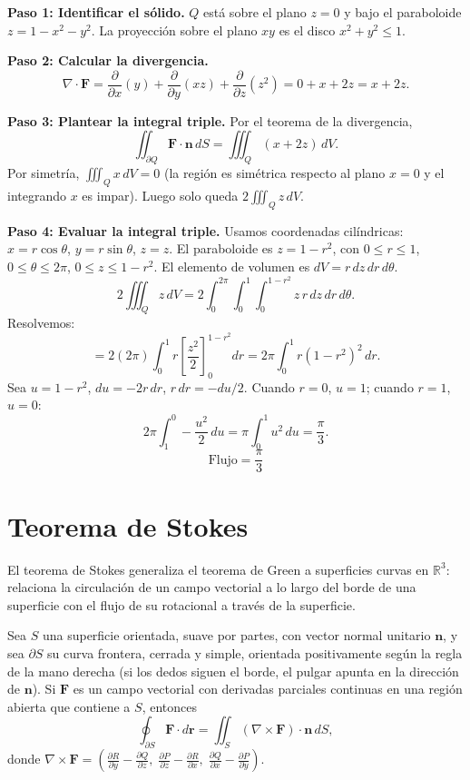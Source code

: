 \begin{myproof}
\textbf{Paso 1: Identificar el sólido.}
$Q$ está sobre el plano $z=0$ y bajo el paraboloide $z=1-x^2-y^2$. La proyección sobre el plano $xy$ es el disco $x^2+y^2\le 1$.

\textbf{Paso 2: Calcular la divergencia.}
\[
\nabla\cdot\mathbf{F}
= \frac{\partial}{\partial x}(y) + \frac{\partial}{\partial y}(xz) + \frac{\partial}{\partial z}(z^2)
= 0 + x + 2z = x+2z.
\]

\textbf{Paso 3: Plantear la integral triple.}
Por el teorema de la divergencia,
\[
\iint_{\partial Q}\mathbf{F}\cdot\mathbf{n}\,dS
= \iiint_Q (x+2z)\,dV.
\]
Por simetría, $\iiint_Q x\,dV = 0$ (la región es simétrica respecto al plano $x=0$ y el integrando $x$ es impar). Luego solo queda $2\iiint_Q z\,dV$.

\textbf{Paso 4: Evaluar la integral triple.}
Usamos coordenadas cilíndricas: $x=r\cos\theta$, $y=r\sin\theta$, $z=z$. El paraboloide es $z=1-r^2$, con $0\le r\le 1$, $0\le\theta\le 2\pi$, $0\le z\le 1-r^2$. El elemento de volumen es $dV = r\,dz\,dr\,d\theta$.
\[
2\iiint_Q z\,dV
= 2\int_0^{2\pi}\int_0^1\int_0^{1-r^2} z\,r\,dz\,dr\,d\theta.
\]
Resolvemos:
\[
= 2(2\pi)\int_0^1 r\left[\frac{z^2}{2}\right]_0^{1-r^2} dr
= 2\pi\int_0^1 r(1-r^2)^2\,dr.
\]
Sea $u=1-r^2$, $du=-2r\,dr$, $r\,dr=-du/2$. Cuando $r=0$, $u=1$; cuando $r=1$, $u=0$:
\[
2\pi\int_1^0 -\frac{u^2}{2}\,du = \pi\int_0^1 u^2\,du = \frac{\pi}{3}.
\]
\[
\boxed{\text{Flujo} = \frac{\pi}{3}}
\]
\end{myproof}

\section{Teorema de Stokes}

El teorema de Stokes generaliza el teorema de Green a superficies curvas en $\mathbb{R}^3$: relaciona la circulación de un campo vectorial a lo largo del borde de una superficie con el flujo de su rotacional a través de la superficie.

\begin{theorem}
Sea $S$ una superficie orientada, suave por partes, con vector normal unitario $\mathbf{n}$, y sea $\partial S$ su curva frontera, cerrada y simple, orientada positivamente según la regla de la mano derecha (si los dedos siguen el borde, el pulgar apunta en la dirección de $\mathbf{n}$). Si $\mathbf{F}$ es un campo vectorial con derivadas parciales continuas en una región abierta que contiene a $S$, entonces
\[
\oint_{\partial S} \mathbf{F}\cdot d\mathbf{r}
=
\iint_S (\nabla\times\mathbf{F})\cdot\mathbf{n}\,dS,
\]
donde $\displaystyle \nabla\times\mathbf{F} = \left( \frac{\partial R}{\partial y}-\frac{\partial Q}{\partial z},\; \frac{\partial P}{\partial z}-\frac{\partial R}{\partial x},\; \frac{\partial Q}{\partial x}-\frac{\partial P}{\partial y} \right)$.
\end{theorem}


